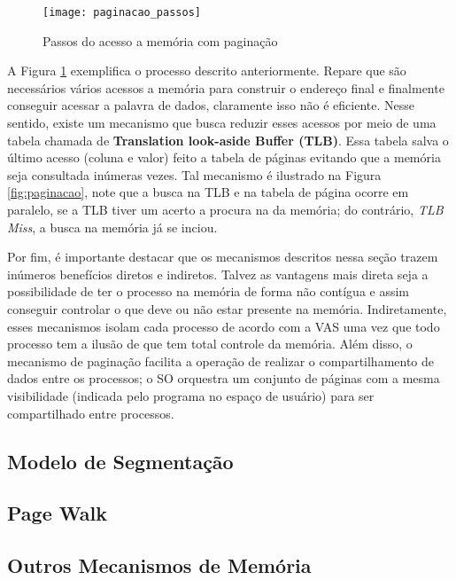 \begin{figure}[!h]
  \centering
  \texttt{[image: paginacao\_passos]} 
  \caption{Passos do acesso a memória com paginação}
  \label{fig:passos_paginacao}
\end{figure}

A Figura \ref{fig:passos_paginacao} exemplifica o processo descrito
anteriormente. Repare que são necessários vários acessos a memória para
construir o endereço final e finalmente conseguir acessar a palavra de dados,
claramente isso não é eficiente. Nesse sentido, existe um mecanismo que busca
reduzir esses acessos por meio de uma tabela chamada de \textbf{Translation
look-aside Buffer (TLB)}. Essa tabela salva o último acesso (coluna e valor)
feito a tabela de páginas evitando que a memória seja consultada inúmeras
vezes. Tal mecanismo é ilustrado na Figura \ref{fig:paginacao}, note que a
busca na TLB e na tabela de página ocorre em paralelo, se a TLB tiver um acerto
a procura na da memória; do contrário, \textit{TLB Miss}, a busca na memória já
se inciou.


Por fim, é importante destacar que os mecanismos descritos nessa seção trazem
inúmeros benefícios diretos e indiretos. Talvez as vantagens mais direta seja a
possibilidade de ter o processo na memória de forma não contígua e assim
conseguir controlar o que deve ou não estar presente na memória. Indiretamente,
esses mecanismos isolam cada processo de acordo com a VAS uma vez que todo
processo tem a ilusão de que tem total controle da memória. Além disso, o
mecanismo de paginação facilita a operação de realizar o compartilhamento de
dados entre os processos; o SO orquestra um conjunto de páginas com a mesma
visibilidade (indicada pelo programa no espaço de usuário) para ser
compartilhado entre processos.

\subsection{Modelo de Segmentação}

\subsection{Page Walk}

\subsection{Outros Mecanismos de Memória}
\label{sec:outros_mecanismos_memoria}

